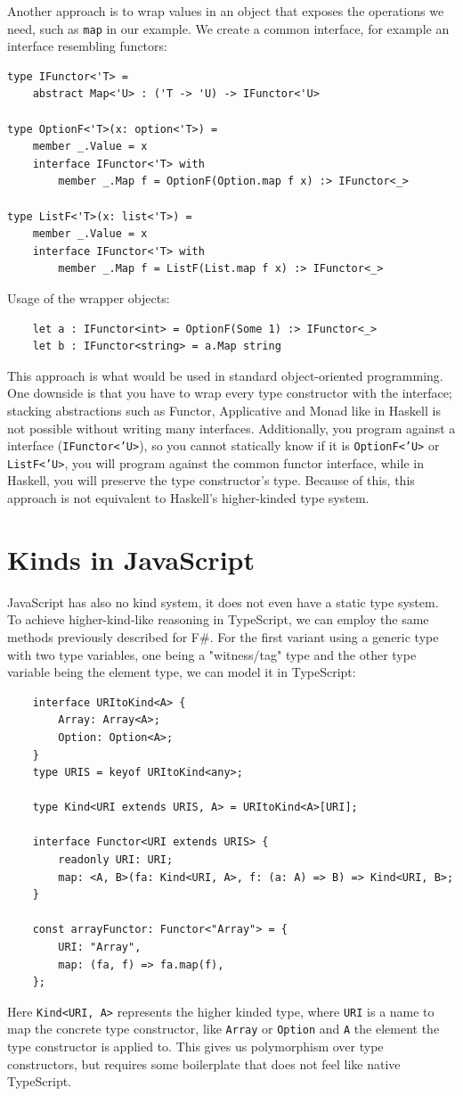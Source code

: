 \documentclass[12pt,oneside,a4paper]{article}
\begin{document}
Another approach is to wrap values in an object that exposes the operations we need, such as \texttt{map} in our example. We create a common interface, for example an interface resembling functors:
\begin{lstlisting}
type IFunctor<'T> =
    abstract Map<'U> : ('T -> 'U) -> IFunctor<'U>

type OptionF<'T>(x: option<'T>) =
    member _.Value = x
    interface IFunctor<'T> with
        member _.Map f = OptionF(Option.map f x) :> IFunctor<_>

type ListF<'T>(x: list<'T>) =
    member _.Value = x
    interface IFunctor<'T> with
        member _.Map f = ListF(List.map f x) :> IFunctor<_>
\end{lstlisting}
Usage of the wrapper objects:
\begin{lstlisting}
    let a : IFunctor<int> = OptionF(Some 1) :> IFunctor<_>
    let b : IFunctor<string> = a.Map string
\end{lstlisting}
This approach is what would be used in standard object-oriented programming. One downside is that you have to wrap every type constructor with the interface; stacking abstractions such as Functor, Applicative and Monad like in Haskell is not possible without writing many interfaces. Additionally, you program against a interface (\texttt{IFunctor<'U>}), so you cannot statically know if it is \texttt{OptionF<'U>} or \texttt{ListF<'U>}, you will program against the common functor interface, while in Haskell, you will preserve the type constructor's type. Because of this, this approach is not equivalent to Haskell's higher-kinded type system.


\section{Kinds in JavaScript}
JavaScript has also no kind system, it does not even have a static type system. To achieve higher-kind-like reasoning in TypeScript, we can employ the same methods previously described for F\#. For the first variant using a generic type with two type variables, one being a "witness/tag" type and the other type variable being the element type, we can model it in TypeScript:
\begin{lstlisting}
    interface URItoKind<A> {
        Array: Array<A>;
        Option: Option<A>;
    }
    type URIS = keyof URItoKind<any>;

    type Kind<URI extends URIS, A> = URItoKind<A>[URI];

    interface Functor<URI extends URIS> {
        readonly URI: URI;
        map: <A, B>(fa: Kind<URI, A>, f: (a: A) => B) => Kind<URI, B>;
    }

    const arrayFunctor: Functor<"Array"> = {
        URI: "Array",
        map: (fa, f) => fa.map(f),
    };
\end{lstlisting}
Here \texttt{Kind<URI, A>} represents the higher kinded type, where \texttt{URI} is a name to map the concrete type constructor, like \texttt{Array} or \texttt{Option} and \texttt{A} the element the type constructor is applied to. This gives us polymorphism over type constructors, but requires some boilerplate that does not feel like native TypeScript.
\end{document}
